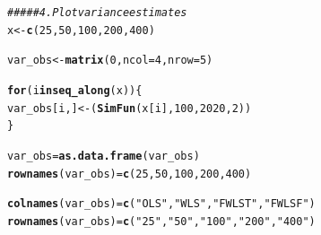 \documentclass{article}\usepackage[]{graphicx}\usepackage[]{color}
\makeatletter
\newcommand{\hlnum}[1]{\textcolor[rgb]{0.686,0.059,0.569}{#1}}%
\newcommand{\hlstr}[1]{\textcolor[rgb]{0.192,0.494,0.8}{#1}}%
\newcommand{\hlcom}[1]{\textcolor[rgb]{0.678,0.584,0.686}{\textit{#1}}}%
\newcommand{\hlstd}[1]{\textcolor[rgb]{0.345,0.345,0.345}{#1}}%
\newcommand{\hlkwa}[1]{\textcolor[rgb]{0.161,0.373,0.58}{\textbf{#1}}}%
\newcommand{\hlkwb}[1]{\textcolor[rgb]{0.69,0.353,0.396}{#1}}%
\newcommand{\hlkwc}[1]{\textcolor[rgb]{0.333,0.667,0.333}{#1}}%
\newcommand{\hlkwd}[1]{\textcolor[rgb]{0.737,0.353,0.396}{\textbf{#1}}}%
\newenvironment{kframe}{%
 \def\at@end@of@kframe{}%
 \ifinner\ifhmode%
  \def\at@end@of@kframe{\end{minipage}}%
  \begin{minipage}{\columnwidth}%
 \fi\fi%
 \def\FrameCommand##1{\hskip\@totalleftmargin \hskip-\fboxsep
 \colorbox{shadecolor}{##1}\hskip-\fboxsep
     \hskip-\linewidth \hskip-\@totalleftmargin \hskip\columnwidth}%
 \MakeFramed {\advance\hsize-\width
   \@totalleftmargin\z@ \linewidth\hsize
   \@setminipage}}%
 {\par\unskip\endMakeFramed%
 \at@end@of@kframe}
\newenvironment{knitrout}{}{} %
\makeatother
\begin{document}
\begin{knitrout}
\color{fgcolor}\begin{kframe}
\begin{alltt}
\hlcom{##### 4. Plot variance estimates}
\hlstd{x} \hlkwb{<-} \hlkwd{c}\hlstd{(}\hlnum{25}\hlstd{,} \hlnum{50}\hlstd{,} \hlnum{100}\hlstd{,} \hlnum{200}\hlstd{,} \hlnum{400}\hlstd{)}

\hlstd{var_obs} \hlkwb{<-} \hlkwd{matrix}\hlstd{(}\hlnum{0}\hlstd{,} \hlkwc{ncol} \hlstd{=} \hlnum{4}\hlstd{,} \hlkwc{nrow} \hlstd{=} \hlnum{5}\hlstd{)}

\hlkwa{for} \hlstd{(i} \hlkwa{in} \hlkwd{seq_along}\hlstd{(x)) \{}
    \hlstd{var_obs[i,]} \hlkwb{<-} \hlstd{(}\hlkwd{SimFun}\hlstd{(x[i],} \hlnum{100}\hlstd{,} \hlnum{2020}\hlstd{,} \hlnum{2}\hlstd{))}
\hlstd{\}}

\hlstd{var_obs} \hlkwb{=} \hlkwd{as.data.frame}\hlstd{(var_obs)}
\hlkwd{rownames}\hlstd{(var_obs)} \hlkwb{=} \hlkwd{c}\hlstd{(}\hlnum{25}\hlstd{,} \hlnum{50}\hlstd{,} \hlnum{100}\hlstd{,} \hlnum{200}\hlstd{,} \hlnum{400}\hlstd{)}


\hlkwd{colnames}\hlstd{(var_obs)} \hlkwb{=} \hlkwd{c}\hlstd{(}\hlstr{"OLS"}\hlstd{,}\hlstr{"WLS"}\hlstd{,}\hlstr{"FWLST"}\hlstd{,}\hlstr{"FWLSF"}\hlstd{)}
\hlkwd{rownames}\hlstd{(var_obs)} \hlkwb{=} \hlkwd{c}\hlstd{(}\hlstr{"25"}\hlstd{,}\hlstr{"50"}\hlstd{,}\hlstr{"100"}\hlstd{,}\hlstr{"200"}\hlstd{,}\hlstr{"400"}\hlstd{)}


\end{alltt}
\end{kframe}
\end{knitrout}
\end{document}
